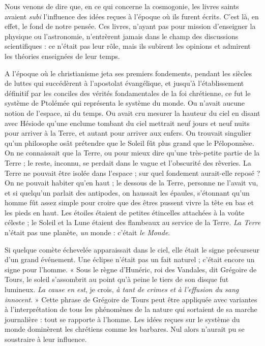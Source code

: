 \documentclass[a4paper, 11pt, oneside]{article}
\begin{document}
Nous venons de dire que, en ce qui concerne la cosmogonie, les livres saints avaient \emph{subi} l'influence des idées reçues à l'époque où ils furent écrits. C'est là, en effet, le fond de notre pensée. Ces livres, n'ayant pas pour mission d'enseigner la physique ou l'astronomie, n'entrèrent jamais dans le champ des discussions scientifiques : ce n'était pas leur rôle, mais ils subirent les opinions et admirent les théories enseignées de leur temps.

A l'époque où le christianisme jeta ses premiers fondements, pendant les siècles de luttes qui succédèrent à l'apostolat évangélique, et jusqu'à l'établissement définitif par les conciles des vérités fondamentales de la foi chrétienne, ce fut le système de Ptolémée qui représenta le système du monde. Ou n'avait aucune notion de l'espace, ni du temps. Ou avait cru mesurer la hauteur du ciel en disant avec Hésiode qu'une enclume tombant du ciel mettrait neuf jours et neuf nuits pour arriver à la Terre, et autant pour arriver aux enfers. On trouvait singulier qu'un philosophe osât prétendre que le Soleil fût plus grand que le Péloponnèse. On ne connaissait que la Terre, ou pour mieux dire qu'une très-petite partie de la Terre ; le reste, inconnu, se perdait dans le vague et l'obscurité des rêveries. La Terre ne pouvait être isolée dans l'espace ; sur quel fondement aurait-elle reposé ? On ne pouvait habiter qu'en haut ; le dessous de la Terre, personne ne l'avait vu, et si quelqu'un parlait des antipodes, on haussait les épaules, s'étonnant qu'un homme fût assez simple pour croire que des êtres pussent vivre la tête en bas et les pieds en haut. Les étoiles étaient de petites étincelles attachées à la voûte céleste ; le Soleil et la Lune étaient des flambeaux au service de la Terre. \emph{La Terre} n'était pas une planète, \emph{un} monde : c'était \emph{le Monde}.

Si quelque comète échevelée apparaissait dans le ciel, elle était le signe précurseur d'un grand événement. Une éclipse n'était pas un fait naturel ; c'était encore un signe pour l'homme. « Sous le règne d'Hunéric, roi des Vandales, dit Grégoire de Tours, le soleil s'assombrit au point qu'à peine le tiers de son disque fut lumineux. \emph{La cause en est}, je crois, \emph{à tant de crimes et à l'effusion du sang innocent}. » Cette phrase de Grégoire de Tours peut être appliquée avec variantes à l'interprétation de tous les phénomènes de la nature qui sortaient de sa marche journalière : tout se rapporte à l'homme. Les idées reçues sur le système du monde dominèrent les chrétiens comme les barbares. Nul alors n'aurait pu se soustraire à leur influence.
\end{document}
